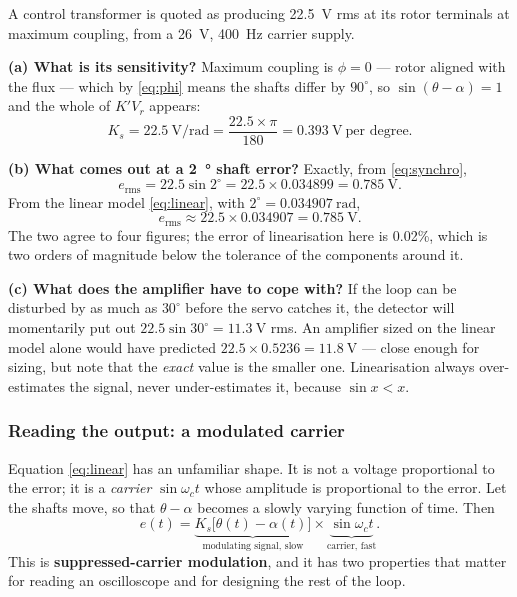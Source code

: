 \documentclass[11pt,a4paper]{article}
\begin{document}
\begin{workedex}[breakable, title={Worked example 1.1 --- sizing a synchro error detector}]
A control transformer is quoted as producing \SI{22.5}{\volt} rms at its rotor
terminals at maximum coupling, from a \SI{26}{\volt}, \SI{400}{\hertz} carrier
supply.

\smallskip
\textbf{(a) What is its sensitivity?} Maximum coupling is $\phi=0$ --- rotor
aligned with the flux --- which by \eqref{eq:phi} means the shafts differ by
$90^\circ$, so $\sin(\theta-\alpha)=1$ and the whole of $K'V_{r}$ appears:
\[
  K_{s}=\SI{22.5}{\volt\per\radian}
       =\frac{22.5\times\pi}{180}=\SI{0.393}{\volt}\ \text{per degree}.
\]

\textbf{(b) What comes out at a \SI{2}{\degree} shaft error?} Exactly, from
\eqref{eq:synchro},
\[
  e_{\text{rms}}=22.5\sin 2^\circ=22.5\times0.034899=\SI{0.785}{\volt}.
\]
From the linear model \eqref{eq:linear}, with
$2^\circ=\SI{0.034907}{\radian}$,
\[
  e_{\text{rms}}\approx22.5\times0.034907=\SI{0.785}{\volt}.
\]
The two agree to four figures; the error of linearisation here is 0.02\%,
which is two orders of magnitude below the tolerance of the components around
it.

\smallskip
\textbf{(c) What does the amplifier have to cope with?} If the loop can be
disturbed by as much as $30^\circ$ before the servo catches it, the detector
will momentarily put out $22.5\sin30^\circ=\SI{11.3}{\volt}$ rms. An amplifier
sized on the linear model alone would have predicted
$22.5\times0.5236=\SI{11.8}{\volt}$ --- close enough for sizing, but note that
the \emph{exact} value is the smaller one. Linearisation always over-estimates
the signal, never under-estimates it, because $\sin x<x$.
\end{workedex}

\subsubsection{Reading the output: a modulated carrier}
\label{sss:carrier}

Equation \eqref{eq:linear} has an unfamiliar shape. It is not a voltage
proportional to the error; it is a \emph{carrier} $\sin\omega_{c}t$ whose
amplitude is proportional to the error. Let the shafts move, so that
$\theta-\alpha$ becomes a slowly varying function of time. Then
\[
  e(t)=\underbrace{K_{s}\big[\theta(t)-\alpha(t)\big]}_{\text{modulating signal, slow}}
       \times\underbrace{\sin\omega_{c}t}_{\text{carrier, fast}} .
\]
This is \textbf{suppressed-carrier modulation}, and it has two properties that
matter for reading an oscilloscope and for designing the rest of the loop.
\end{document}
